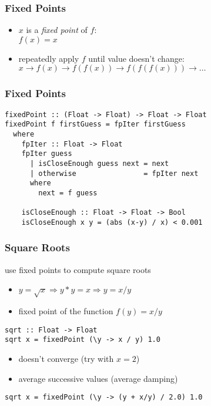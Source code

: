 \documentclass[dvipsnames]{beamer}
\theoremstyle{plain}
\begin{document}
\begin{frame}
  \frametitle{Fixed Points}

  \begin{itemize}
    \item $x$ is a \emph{fixed point} of $f$:\\
      $f(x)=x$

    \medskip
    \item repeatedly apply $f$ until value doesn't change:\\
      $x \rightarrow f(x) \rightarrow f(f(x)) \rightarrow f(f(f(x)))
      \rightarrow \ldots$
  \end{itemize}
\end{frame}

\begin{frame}[fragile]
  \frametitle{Fixed Points}

  \begin{lstlisting}[deletekeywords={next}]
fixedPoint :: (Float -> Float) -> Float -> Float
fixedPoint f firstGuess = fpIter firstGuess
  where
    fpIter :: Float -> Float
    fpIter guess
      | isCloseEnough guess next = next
      | otherwise                = fpIter next
      where
        next = f guess

    isCloseEnough :: Float -> Float -> Bool
    isCloseEnough x y = (abs (x-y) / x) < 0.001
  \end{lstlisting}
\end{frame}

\begin{frame}[fragile]
  \frametitle{Square Roots}

  \begin{exampleblock}{use fixed points to compute square roots}
    \begin{itemize}
      \item $y = \sqrt{x} \Rightarrow y * y = x \Rightarrow y = x / y$
      \item fixed point of the function $f(y) = x / y$
    \end{itemize}

    \smallskip
    \begin{lstlisting}[deletekeywords={sqrt}]
sqrt :: Float -> Float
sqrt x = fixedPoint (\y -> x / y) 1.0
    \end{lstlisting}
  \end{exampleblock}

  \pause
  \vspace{-6pt}
  \begin{itemize}
    \item doesn't converge (try with $x=2$)
    \item average successive values (average damping)
  \end{itemize}

  \begin{exampleblock}{}
    \begin{lstlisting}[deletekeywords={sqrt}]
sqrt x = fixedPoint (\y -> (y + x/y) / 2.0) 1.0
    \end{lstlisting}
  \end{exampleblock}
\end{frame}
\end{document}
